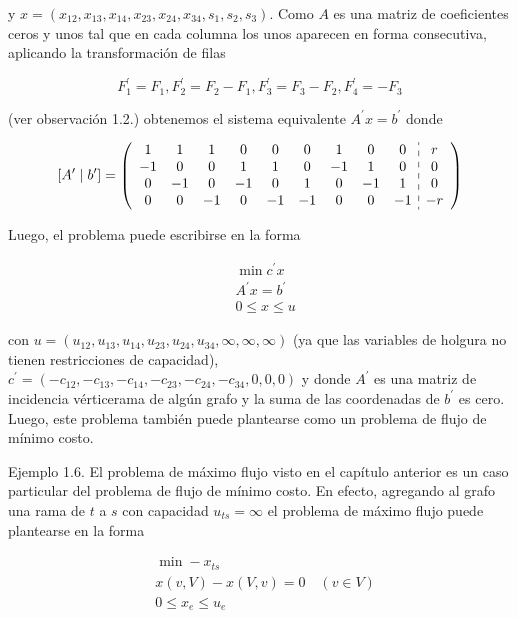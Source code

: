 \documentclass[10pt]{article}
\begin{document}
y $x=\left(x_{12}, x_{13}, x_{14}, x_{23}, x_{24}, x_{34}, s_{1}, s_{2}, s_{3}\right)$. Como $A$ es una matriz de coeficientes ceros y unos tal que en cada columna los unos aparecen en forma consecutiva, aplicando la transformación de filas

$$
F_{1}^{\prime}=F_{1}, F_{2}^{\prime}=F_{2}-F_{1}, F_{3}^{\prime}=F_{3}-F_{2}, F_{4}^{\prime}=-F_{3}
$$

(ver observación 1.2.) obtenemos el sistema equivalente $A^{\prime} x=b^{\prime}$ donde

$$
\left[A^{\prime} \mid b^{\prime}\right]=\left(\begin{array}{ccccccccc:c}
1 & 1 & 1 & 0 & 0 & 0 & 1 & 0 & 0 & r \\
-1 & 0 & 0 & 1 & 1 & 0 & -1 & 1 & 0 & 0 \\
0 & -1 & 0 & -1 & 0 & 1 & 0 & -1 & 1 & 0 \\
0 & 0 & -1 & 0 & -1 & -1 & 0 & 0 & -1 & -r
\end{array}\right)
$$

Luego, el problema puede escribirse en la forma

$$
\begin{aligned}
& \min c^{\prime} x \\
& A^{\prime} x=b^{\prime} \\
& 0 \leq x \leq u
\end{aligned}
$$

con $u=\left(u_{12}, u_{13}, u_{14}, u_{23}, u_{24}, u_{34}, \infty, \infty, \infty\right)$ (ya que las variables de holgura no tienen restricciones de capacidad), $c^{\prime}=\left(-c_{12},-c_{13},-c_{14},-c_{23},-c_{24},-c_{34}, 0,0,0\right)$ y donde $A^{\prime}$ es una matriz de incidencia vérticerama de algún grafo y la suma de las coordenadas de $b^{\prime}$ es cero. Luego, este problema también puede plantearse como un problema de flujo de mínimo costo.

Ejemplo 1.6. El problema de máximo flujo visto en el capítulo anterior es un caso particular del problema de flujo de mínimo costo. En efecto, agregando al grafo una rama de $t$ a $s$ con capacidad $u_{t s}=\infty$ el problema de máximo flujo puede plantearse en la forma

$$
\begin{aligned}
& \min -x_{t s} \\
& x(v, V)-x(V, v)=0 \quad(v \in V) \\
& 0 \leq x_{e} \leq u_{e}
\end{aligned}
$$
\end{document}
